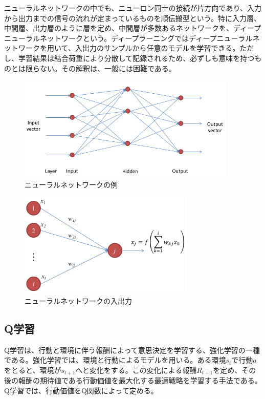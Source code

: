 \documentclass[12pt]{jreport}
\begin{document}
ニューラルネットワークの中でも、ニューロン同士の接続が片方向であり、入力から出力までの信号の流れが定まっているものを順伝搬型という。特に入力層、中間層、出力層のように層を定め、中間層が多数あるネットワークを、ディープニューラルネットワークという。ディープラーニングではディープニューラルネットワークを用いて、入出力のサンプルから任意のモデルを学習できる。ただし、学習結果は結合荷重により分散して記録されるため、必ずしも意味を持つものとは限らない。その解釈は、一般には困難である。

\begin{figure}[tb]
  \begin{center}
  \includegraphics[height=5cm]{img/NN_model.png}
  \caption{ニューラルネットワークの例} \label{fig:NN_model}
\end{center}
\end{figure}

\begin{figure}[tb]
  \begin{center}
  \includegraphics[height=5cm]{img/NN_InOut.png}
  \caption{ニューラルネットワークの入出力} \label{fig:NN_InOut}
\end{center}
\end{figure}

\subsection{Q学習}
Q学習は、行動と環境に伴う報酬によって意思決定を学習する、強化学習の一種である。強化学習では、環境と行動によるモデルを用いる。ある環境$s_{t}$で行動$a$をとると、環境が$s_{t+1}$へと変化をする。この変化による報酬$R_{t+1}$を定め、その後の報酬の期待値である行動価値を最大化する最適戦略を学習する手法である。Q学習では、行動価値をQ関数によって定める。
\end{document}
